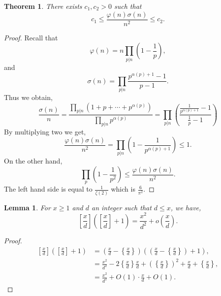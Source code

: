 \documentclass{article}
\newtheorem{theorem}{Theorem} [section]
\newtheorem{lemma}{Lemma}[section]
\begin{document}

\begin{theorem}
  There exists $c_1,c_2>0$ such that 
  \begin{equation*}
    c_1\leq {\frac {\varphi(n)\sigma(n)} {n^2}}\leq c_2.
  \end{equation*}
\end{theorem}

\begin{proof}
  Recall that 
  \begin{equation*}
    \varphi(n) = n\prod_{p|n}\left(1-{\frac 1 p}\right),
  \end{equation*}
  and 
  \begin{equation*}
    \sigma(n) = \prod_{p|n}{\frac {p^{\alpha(p)+1} - 1} {p -1}}.
  \end{equation*}
  Thus we obtain,
  \begin{equation*}
    {\frac {\sigma(n)} n} = {\frac {\prod_{p|n}(1+p+\cdots+p^{\alpha(p)})} {\prod_{p|n} p^{\alpha(p)}}} = \prod_{p|n} \left({\frac {{\frac 1 {p^{\alpha(p)+1}}}-1} {{\frac 1 p} - 1}}\right)
  \end{equation*}
  By multiplying two we get,
  \begin{equation*}
    {\frac {\varphi(n)\sigma(n)} {n^2}} = \prod_{p|n} \left(1- {\frac 1 {p^{\alpha(p)+1}}}\right)\leq 1.
  \end{equation*}
  On the other hand,
  \begin{equation*}
    \prod_{p}\left(1-{\frac 1 {p^2}}\right)\leq {\frac {\varphi(n)\sigma(n)} {n^2}}. 
  \end{equation*}
  The left hand side is equal to ${\frac 1 {\zeta(2)}}$ which is ${\frac 6 {\pi^2}}$.
\end{proof}


\begin{lemma}
  For $x\geq1$ and $d$ an integer such that $d\leq x$, we have,
  \begin{equation*}
  \left[{\frac x d}\right]\left(\left[{\frac x d}\right]+1\right) = {\frac {x^2} {d^2}}+o\left({\frac x d}\right).
\end{equation*}
\label{lemma_integer_part_square_estimate}
\end{lemma}

\begin{proof}
  \begin{align*}
    \left[{\frac x d}\right]\left(\left[{\frac x d}\right]+1\right) & = \left({\frac x d}-\left\{{\frac x d}\right\}\right)\left(\left({\frac x d}-\left\{{\frac x d}\right\}\right)+1\right),\\
    & = {\frac {x^2}{d^2}}-2\left\{{\frac x d}\right\}{\frac x d}+\left(\left\{{\frac x d}\right\}\right)^2+{\frac x d}+\left\{{\frac x d}\right\},\\
    & = {\frac {x^2}{d^2}}+O(1)\cdot{\frac x d}+O(1).
  \end{align*}
\end{proof}
\end{document}
